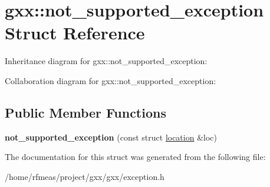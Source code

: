 \hypertarget{structgxx_1_1not__supported__exception}{}\section{gxx\+:\+:not\+\_\+supported\+\_\+exception Struct Reference}
\label{structgxx_1_1not__supported__exception}


Inheritance diagram for gxx\+:\+:not\+\_\+supported\+\_\+exception\+:


Collaboration diagram for gxx\+:\+:not\+\_\+supported\+\_\+exception\+:
\subsection*{Public Member Functions}
\begin{DoxyCompactItemize}
\item 
{\bfseries not\+\_\+supported\+\_\+exception} (const struct \hyperlink{structlocation}{location} \&loc)\hypertarget{structgxx_1_1not__supported__exception_ad54b67d66699d651d3dcf1c422ca765e}{}\label{structgxx_1_1not__supported__exception_ad54b67d66699d651d3dcf1c422ca765e}

\end{DoxyCompactItemize}


The documentation for this struct was generated from the following file\+:\begin{DoxyCompactItemize}
\item 
/home/rfmeas/project/gxx/gxx/exception.\+h\end{DoxyCompactItemize}
